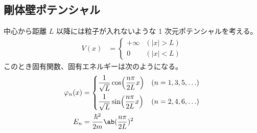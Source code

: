 \documentclass[uplatex,dvipdfmx,a4paper,11pt]{jlreq}
\numberwithin{equation}{section}
\theoremstyle{definition}
\begin{document}
\subsection{剛体壁ポテンシャル}
\begin{proposition}
  中心から距離 $L$ 以降には粒子が入れないような 1 次元ポテンシャルを考える。
  \begin{align}
    V(x) & = \begin{cases}
               + \infty & (|x| > L) \\
               0        & (|x| < L)
             \end{cases}
  \end{align}
  このとき固有関数、固有エネルギーは次のようになる。
  \begin{align}
    \varphi_n(x) & = \begin{dcases}
                       \frac{1}{\sqrt{L}}\cos(\frac{n\pi}{2L}x) & (n = 1,3,5,\ldots) \\
                       \frac{1}{\sqrt{L}}\sin(\frac{n\pi}{2L}x) & (n = 2,4,6,\ldots)
                     \end{dcases} \\
    E_n          & = \frac{\hbar^2}{2m}\ab(\frac{n\pi}{2L})^2
  \end{align}
\end{proposition}
\end{document}
